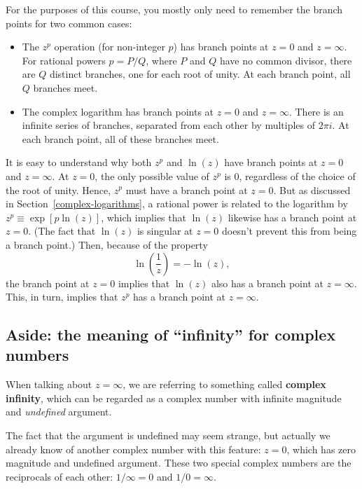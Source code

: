 \documentclass[10pt,a4paper]{article}
\begin{document}
For the purposes of this course, you mostly only need to remember the
branch points for two common cases:

\begin{itemize}
\item
  The $z^p$ operation (for non-integer $p$) has branch points at
  $z = 0$ and $z = \infty$. For rational powers $p = P/Q$, where
  $P$ and $Q$ have no common divisor, there are $Q$ distinct
  branches, one for each root of unity. At each branch point, all $Q$
  branches meet.
\item
  The complex logarithm has branch points at $z = 0$ and $z =
  \infty$. There is an infinite series of branches, separated from
  each other by multiples of $2 \pi i$. At each branch point, all of
  these branches meet.
\end{itemize}

It is easy to understand why both $z^p$ and $\ln(z)$ have branch
points at $z = 0$ and $z = \infty$. At $z = 0$, the only possible
value of $z^p$ is $0$, regardless of the choice of the root of
unity. Hence, $z^p$ must have a branch point at $z = 0$. But as
discussed in Section~\ref{complex-logarithms}, a rational power is
related to the logarithm by $z^p \equiv \exp[p\ln(z)]$, which implies
that $\ln(z)$ likewise has a branch point at $z = 0$. (The fact that
$\ln(z)$ is singular at $z = 0$ doesn't prevent this from being a
branch point.) Then, because of the property
\begin{equation}
\ln\left(\frac{1}{z}\right) = -\ln(z),
\end{equation}
the branch point at $z = 0$ implies that $\ln(z)$ also has a branch
point at $z = \infty$. This, in turn, implies that $z^p$ has a
branch point at $z = \infty$.

\subsection{Aside: the meaning of ``infinity'' for complex numbers}
\label{aside-the-meaning-of-infinity-for-complex-numbers}

When talking about $z = \infty$, we are referring to something called
\textbf{complex infinity}, which can be regarded as a complex number
with infinite magnitude and \emph{undefined} argument.

The fact that the argument is undefined may seem strange, but actually
we already know of another complex number with this feature: $z = 0$,
which has zero magnitude and undefined argument. These two special
complex numbers are the reciprocals of each other: $1/\infty = 0$ and
$1/0 = \infty$.
\end{document}

